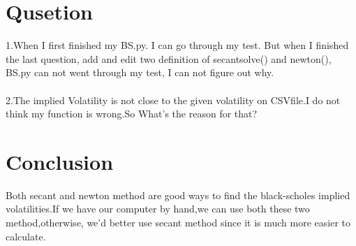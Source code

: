 \documentclass[a4paper]{article}
\begin{document}
\section{Qusetion}
1.When I first finished my BS.py. I can go through my test. But when I finished the last question, add and edit two definition of secantsolve() and newton(), BS.py can not went through my test, I can not figure out why.
\\
\\2.The implied Volatility is not close to the given volatility on CSVfile.I do not think my function is wrong.So What's the reason for that?

\section{Conclusion}
Both secant and newton method are good ways to find the black-scholes implied volatilities.If we have our computer by hand,we can use both these two method,otherwise, we'd better use secant method since it is much more easier to calculate.
\end{document}
